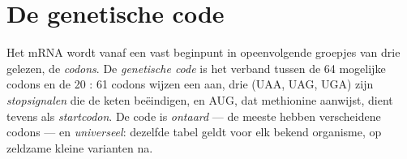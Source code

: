 \section{De genetische code}

\begin{definition}\label{def:g11:gene-expression:code}
Het mRNA wordt vanaf een vast beginpunt in opeenvolgende groepjes van
drie  gelezen, de \emph{codons}. De
\emph{genetische code} is het verband tussen de 64
mogelijke codons en de 20 : 61 codons wijzen een  aan,
drie (UAA, UAG, UGA) zijn \emph{stopsignalen} die de keten beëindigen, en
AUG, dat methionine aanwijst, dient tevens als \emph{startcodon}. De code
is \emph{ontaard} --- de meeste  hebben verscheidene codons ---
en \emph{universeel}: dezelfde tabel geldt voor elk bekend organisme, op
zeldzame kleine varianten na.
\end{definition}


